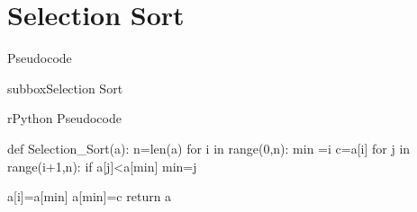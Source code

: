 \documentclass[10pt,a4paper]{article}
\begin{document}

\section*{Selection Sort}
\begin{textbox}{Pseudocode}
\begin{subbox}{subbox}{Selection Sort}
\begin{codebox}{r}{Python Pseudocode}

def Selection_Sort(a):
n=len(a)
for i in range(0,n):
	min =i
	c=a[i]
	for j in range(i+1,n):
		if a[j]<a[min]
			min=j 
	
	a[i]=a[min]
	a[min]=c	
    return a
\end{codebox}
\end{subbox}
\end{textbox}
\end{document}
